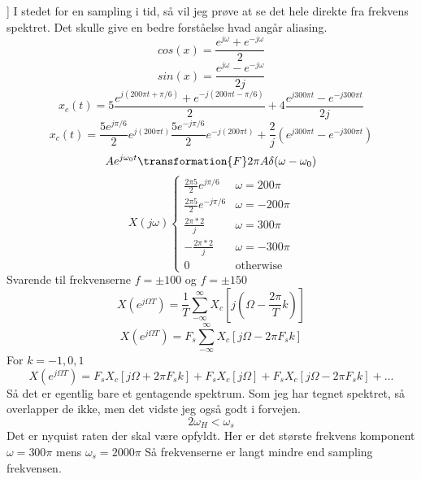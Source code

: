 \begin{Opgaver}
\begin{kapitel}
\begin{Opgave}
            \begin{UnderOpgave}[Determine the spectrum \text{$X(e^{j\omega}) of x[n]$} plot its magnitude as a function of w in rad/sam and as a function of F in Hz.
                Explain whether the original signal xc(t) can be recovered from x[n]]
                I stedet for en sampling i tid, så vil jeg prøve at se det hele direkte fra frekvens spektret. Det skulle give en bedre forståelse hvad angår aliasing. 
                \[cos(x) = \frac{e^{j\omega} + e^{-j\omega}}{2}\]
                \[sin(x) = \frac{e^{j\omega} - e^{-j\omega}}{2j}\]
                \[x_c(t) = 5\frac{e^{j(200\pi t + \pi/6)} + e^{-j(200\pi t - \pi/6)}}{2} + 4\frac{e^{j300\pi t} - e^{-j300\pi t}}{2j}\]
                \[x_c(t) = \frac{5e^{j\pi/6}}{2}e^{j(200\pi t)} \frac{5e^{-j\pi/6}}{2} e^{-j(200\pi t)} + \frac{2}{j}(e^{j300\pi t} - e^{-j300\pi t})\]
                \[Ae^{j\omega_0t} \transformation{F} 2\pi A\delta(\omega - \omega_0)\]
                \[X(j\omega) 
                    \begin{cases}
                        \frac{2\pi 5}{2}e^{j\pi/6} & \omega = 200\pi \\
                        \frac{2\pi 5}{2}e^{-j\pi/6} & \omega = -200\pi \\
                        \frac{2\pi * 2}{j}          & \omega = 300\pi \\
                        -\frac{2\pi * 2}{j}          & \omega = -300\pi \\
                        0 & \text{otherwise}
                    \end{cases} 
                \]
                Svarende til frekvenserne $f = \pm 100$ og $f = \pm 150$
                \[X(e^{j\Omega T}) = \frac{1}{T} \sum_{-\infty}^{\infty}{X_c[j(\Omega - \frac{2\pi}{T}k)]}\]
                \[X(e^{j\Omega T}) = F_s\sum_{-\infty}^{\infty}{X_c[j\Omega - 2\pi F_s k]}\]
                For $k = -1, 0, 1$
                \[X(e^{j\Omega T}) = F_s X_c[j\Omega + 2\pi F_s k] + F_s X_c[j\Omega] + F_s X_c[j\Omega - 2\pi F_s k] + ... \]
                Så det er egentlig bare et gentagende spektrum. Som jeg har tegnet spektret, så overlapper de ikke, men det vidste jeg også godt i forvejen. 
                \[2\omega_H < \omega_s\]
                Det er nyquist raten der skal være opfyldt. Her er det største frekvens komponent $\omega = 300\pi$ mens $\omega_s = 2000\pi$
                Så frekvenserne er langt mindre end sampling frekvensen.                 
            \end{UnderOpgave}

\end{Opgave}
\end{kapitel}
\end{Opgaver}
